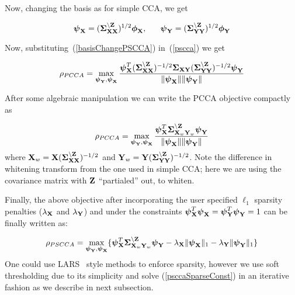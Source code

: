 \documentclass{llncs}
\newcommand{\X}{{\bf X}}
\newcommand{\Y}{{\bf Y}}
\newcommand{\Z}{{\bf Z}}
\newcommand{\bs}{\boldsymbol}
\begin{document}
Now, changing the basis as for simple CCA, we get

\begin{equation}
\label{basisChangePSCCA}
\bs\psi_{\X} = (\bs\Sigma_{\X\X}^{\backslash \Z})^{1/2}\bs\phi_{\X}, \;\;\;\;\;\;   \bs\psi_{\Y} = (\bs\Sigma_{\Y\Y}^{\backslash \Z})^{1/2}\bs\phi_{\Y} 
\end{equation}

Now, substituting~(\ref{basisChangePSCCA}) in~(\ref{pscca}) we get 

\begin{equation}
\label{subsPSCCA}
\rho_{PCCA}= \max_{{\bs\psi_{\Y}}, {\bs\psi_{\X}}} \frac{\bs\psi_{\X}^T (\bs\Sigma_{\X\X}^{\backslash \Z})^{-1/2}\bs\Sigma_{\X\Y}(\bs\Sigma_{\Y\Y}^{\backslash \Z})^{-1/2}\bs\psi_{\Y}}{\|\bs\psi_{\X}\| \|\bs\psi_{\Y}\|}
\end{equation}

After some algebraic manipulation we can write the PCCA objective compactly as

\begin{equation}
\label{psccacompact}
\rho_{PCCA}=\max_{{\bs\psi_{\Y}}, {\bs\psi_{\X}}} \frac{\bs\psi_{\X}^T \bs\Sigma_{\X_w\Y_w}^{\backslash \Z}\bs\psi_{\Y}}{\|\bs\psi_{\X}\| \|\bs\psi_{\Y}\|}
\end{equation}
where $\X_w=\X(\bs\Sigma_{\X\X}^{\backslash \Z})^{-1/2}$ and $\Y_w=\Y(\bs\Sigma_{\Y\Y}^{\backslash \Z})^{-1/2}$. Note the difference in whitening transform from the one used in simple CCA; here we are using the covariance matrix with $\Z$ ``partialed'' out, to whiten.


Finally, the above objective after incorporating the user specified $\ell_1$ sparsity penalties ($\lambda_{\X}$ and $\lambda_{\Y}$) and under the constraints $\bs\psi_{\X}^T\bs\psi_{\X}=\bs\psi_{\Y}^T\bs\psi_{\Y}=1$ can be finally written as:

\begin{equation}
\label{psccaSparseConst}
\rho_{PSCCA}=\max_{{\bs\psi_{\Y}}, {\bs\psi_{\X}}} \{ \bs\psi_{\X}^T \bs\Sigma_{\X_w\Y_w}^{\backslash \Z}\bs\psi_{\Y} - \lambda_{\X}\|\bs\psi_{\X}\|_1 - \lambda_{\Y}\|\bs\psi_{\Y}\|_1\}
\end{equation}
One could use LARS~\cite{lars} style methods to enforce sparsity, however we use soft thresholding due to its simplicity and solve  (\ref{psccaSparseConst}) in an iterative fashion as we describe in next subsection.



\end{document}
